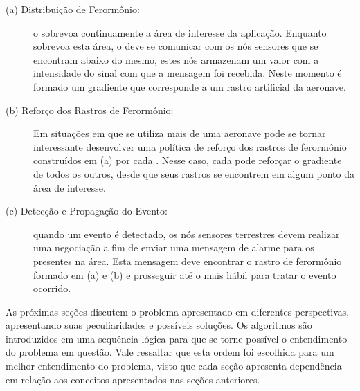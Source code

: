\begin{description}

	\item[ (a) Distribuição de Ferormônio: ] o \vant sobrevoa continuamente
a área de interesse da aplicação. Enquanto sobrevoa esta área, o \vant deve se
comunicar com os nós sensores que se encontram abaixo do mesmo, estes nós
armazenam um valor com a intensidade do sinal com que a mensagem foi recebida.
Neste momento é formado um gradiente que corresponde a um rastro artificial da aeronave.

	\item[ (b) Reforço dos Rastros de Ferormônio:] Em situações em que se utiliza mais de uma aeronave pode se 
tornar interessante desenvolver uma política de reforço dos rastros de ferormônio construídos em (a) por cada \vant.
Nesse caso, cada \vant pode reforçar o gradiente de todos os outros, desde que seus rastros se encontrem em algum ponto
da área de interesse.
	
	\item[ (c) Detecção e Propagação do Evento:] quando um evento é
detectado, os nós sensores terrestres devem realizar uma negociação a fim de
enviar uma mensagem de alarme para os \vants presentes na área. Esta mensagem
deve encontrar o rastro de ferormônio formado em (a) e (b) e prosseguir até o \vant
mais hábil para tratar o evento ocorrido.




\end{description}

As próximas seções discutem o problema apresentado em diferentes perspectivas, apresentando suas peculiaridades e possíveis
soluções. Os algoritmos são introduzidos em uma sequência lógica para que se torne possível o entendimento do problema em questão. Vale 
ressaltar que esta ordem foi escolhida para um melhor entendimento do problema, visto que cada seção apresenta dependência em relação aos conceitos
apresentados nas seções anteriores. 


